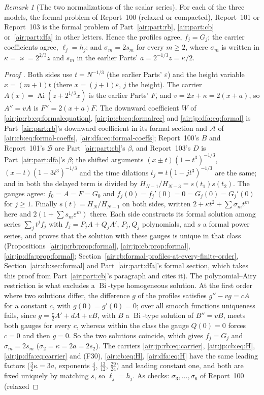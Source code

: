 \documentclass[11pt,letterpaper]{article}
\numberwithin{equation}{section}
\theoremstyle{remark}
\newtheorem{remark}[theorem]{Remark}
\newcommand{\Ai}{\operatorname{Ai}}
\newcommand{\eps}{\varepsilon}
\begin{document}
\begin{remark}[The two normalizations of the scalar series]\label{air:jp:rem:sigma}
For each of the three models, the formal problem of Report~100 (relaxed or compacted), Report~101 or Report~103 is the formal problem of Part~\ref{air:part:rb}, \ref{air:part:cb} or~\ref{air:part:dfa} in other letters. Hence the profiles agree, $f_j=G_j$; the carrier coefficients agree, $\ell_j=h_j$; and $\sigma_m=2s_m$ for every $m\ge2$, where $\sigma_m$ is written in $\kappa=\varkappa=2^{2/3}z$ and $s_m$ in the earlier Parts' $a=2^{-1/3}z=\kappa/2$.
\end{remark}
\begin{proof}[Proof {\normalfont[write]}]
Both sides use $t=N^{-1/3}$ (the earlier Parts' $\eps$) and the height variable $x=(m+1)t$ (there $x=(j+1)\eps$, $j$ the height). The carrier $A(x)=\Ai(z+2^{1/3}x)$ is the earlier Parts' $F$, and $v=2x+\kappa=2(x+a)$, so $A''=vA$ is $F''=2(x+a)F$. The downward coefficient $W$ of \eqref{air:jp:rb:eq:formalequation}, \eqref{air:jp:cb:eq:formalrec} and \eqref{air:jp:dfa:eq:formal} is Part~\ref{air:part:rb}'s downward coefficient in its formal section and $\mathcal A$ of \eqref{air:cb:eq:formal-coeffs}, \eqref{air:dfa:eq:formal-coeffs}; Report~100's $B$ and Report~101's $\mathcal B$ are Part~\ref{air:part:cb}'s $\beta$, and Report~103's $D$ is Part~\ref{air:part:dfa}'s $\beta$; the shifted arguments $(x\pm t)(1-t^3)^{-1/3}$, $(x-t)(1-3t^3)^{-1/3}$ and the time dilations $t_j=t(1-jt^3)^{-1/3}$ are the same; and in both the delayed term is divided by $H_{N-1}/H_{N-3}=s(t_1)s(t_2)$. The gauges agree: $f_0=A=F=G_0$ and $f_j(0)=f_j'(0)=0=G_j(0)=G_j'(0)$ for $j\ge1$. Finally $s(t)=H_N/H_{N-1}$ on both sides, written $2+\kappa t^2+\sum\sigma_mt^m$ here and $2(1+\sum s_m\eps^m)$ there. Each side constructs its formal solution among series $\sum_jt^jf_j$ with $f_j=P_jA+Q_jA'$, $P_j,Q_j$ polynomials, and $s$ a formal power series, and proves that the solution with these gauges is unique in that class (Propositions~\ref{air:jp:rb:prop:formal}, \ref{air:jp:cb:prop:formal}, \ref{air:jp:dfa:prop:formal}; Section~\ref{air:rb:formal-profiles-at-every-finite-order}, Section~\ref{air:cb:sec:formal} and Part~\ref{air:part:dfa}'s formal section, which takes this proof from Part~\ref{air:part:cb}'s paragraph and cites it). The polynomial--Airy restriction is what excludes a $\operatorname{Bi}$-type homogeneous solution. At the first order where two solutions differ, the difference $g$ of the profiles satisfies $g''-vg=cA$ for a constant $c$, with $g(0)=g'(0)=0$; over all smooth functions uniqueness fails, since $g=\frac c2A'+dA+eB$, with $B$ a $\operatorname{Bi}$-type solution of $B''=vB$, meets both gauges for every $c$, whereas within the class the gauge $Q(0)=0$ forces $c=0$ and then $g=0$. So the two solutions coincide, which gives $f_j=G_j$ and $\sigma_m=2s_m$ ($\sigma_2=\kappa=2a=2s_2$). The carriers \eqref{air:jp:rb:eq:carrier}, \eqref{air:jp:cb:eq:H}, \eqref{air:jp:dfa:eq:carrier} and (F30), \eqref{air:cb:eq:H}, \eqref{air:dfa:eq:H} have the same leading factors ($\frac32\kappa=3a$, exponents $\frac43$, $\frac{13}{12}$, $\frac{29}{24}$) and leading constant one, and both are fixed uniquely by matching $s$, so $\ell_j=h_j$. As checks: $\sigma_3,\ldots,\sigma_6$ of Report~100 (relaxed 
\end{proof}
\end{document}
